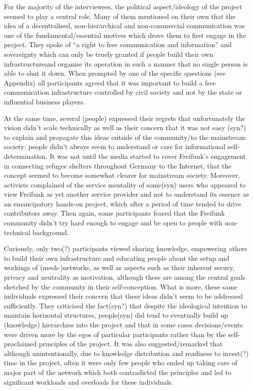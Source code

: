 For the majority of the interviewees, the political aspect/ideology of the project seemed to play a central role.
Many of them mentioned on their own that the idea of a decentralised, non-hierarchical and non-commercial communication was one of the fundamental/essential motives which drove them to first engage in the project.
They spoke of ``a right to free communication and information'' and sovereignty which can only be truely granted if people build their own infrastructureand organise its operation in such a manner that no single person is able to shut it down.
When prompted by one of the specific questions (see Appendix) all participants agreed that it was important to build a free communication infrastructure controlled by civil society and not by the state or influential business players.

At the same time, several (people) expressed their regrets that unfortunately the vision didn't scale technically as well as their concern that it was not easy (syn?) to explain and propagate this ideas outside of the community/to the mainstream society: people didn't always seem to understand or care for informational self-determination.
It was not until the media started to cover Freifunk's engagement in connecting refugee shelters throughout Germany to the Internet, that the concept seemed to become somewhat clearer for mainstream society.
Moreover, activists complained of the service mentality of some(syn) users who appeared to view Freifunk as yet another service provider and not to understand its essence as an emancipatory hands-on project, which after a period of time tended to drive contributors away.
Then again, some participants feared that the Freifunk community didn't try hard enough to engage and be open to people with non-technical background.


Curiously, only two(?) participants viewed sharing knowledge, empowering others to build their own infrastructure and educating people about the setup and workings of (mesh-)networks, as well as aspects such as their inherent secury, privacy and neutrality as motivation, although these are among the central goals sketched by the community in their self-conception\cite{ffweb}.
What is more, these same individuals expressed their concern that these ideas didn't seem to be addressed sufficiently.
They criticised the fact(syn?) that despite the ideological intention to maintain horizontal structures, people(syn) did tend to eventually build up (knowledge) hierarchies into the project and that in some cases decisions/events were driven more by the egos of particular participants rather than by the self-proclaimed principles of the project.
It was also suggested/remarked that although unintentionally, due to knowledge distribution and readiness to invest(?) time in the project, often it were only few people who ended up taking care of major part of the network which both contradicted the principles and led to significant workloads and overloads for these individuals.


